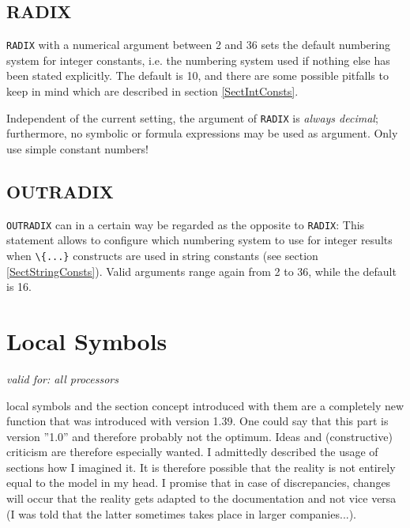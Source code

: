 \documentclass[12pt,twoside]{report}
\makeatletter
\newcommand{\tty}[1]{{\tt #1}}
\newcommand{\ttindex}[1]{\index{#1@{\tt #1}}}
\makeatother
\begin{document}
\subsection{RADIX}
\ttindex{RADIX}

\tty{RADIX} with a numerical argument between 2 and 36 sets the default
numbering system for integer constants, i.e. the numbering system used if
nothing else has been stated explicitly.  The default is 10, and there are
some possible pitfalls to keep in mind which are described in section
\ref{SectIntConsts}.

Independent of the current setting, the argument of {\tt RADIX} is {\em
always decimal}; furthermore, no symbolic or formula expressions may be
used as argument. Only use simple constant numbers!


\subsection{OUTRADIX}
\ttindex{OUTRADIX}   

\tty{OUTRADIX} can in a certain way be regarded as the opposite to
\tty{RADIX}: This statement allows to configure which numbering system to
use for integer results when \verb!\{...}! constructs are used in string
constants (see section \ref{SectStringConsts}).  Valid arguments range
again from 2 to 36, while the default is 16.


\section{Local Symbols}
\label{ChapLocSyms}

{\em valid for: all processors}

local symbols and the section concept introduced with them are a
completely new function that was introduced with version 1.39.  One
could say that this part is version ''1.0'' and therefore probably not
the optimum.  Ideas and (constructive) criticism are therefore
especially wanted.  I admittedly described the usage of sections how
I imagined it.  It is therefore possible that the reality is not
entirely equal to the model in my head.  I promise that in case of
discrepancies, changes will occur that the reality gets adapted to
the documentation and not vice versa (I was told that the latter
sometimes takes place in larger companies...).
\end{document}
